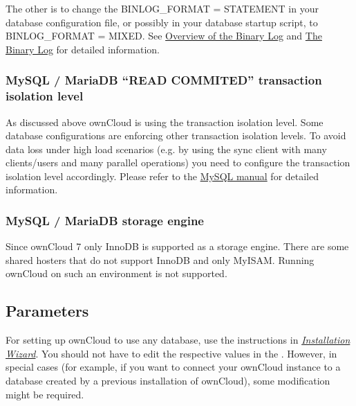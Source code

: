 \documentclass[letterpaper,10pt,english]{sphinxmanual}
\begin{document}
The other is to change the BINLOG\_FORMAT = STATEMENT in your database
configuration file, or possibly in your database startup script, to
BINLOG\_FORMAT = MIXED. See \href{https://mariadb.com/kb/en/mariadb/overview-of-the-binary-log/}{Overview of the Binary
Log} and \href{https://dev.mysql.com/doc/refman/5.6/en/binary-log.html}{The
Binary Log} for
detailed information.


\subsubsection{MySQL / MariaDB ``READ COMMITED'' transaction isolation level}
\label{configuration_database/linux_database_configuration:mysql-mariadb-read-commited-transaction-isolation-level}\label{configuration_database/linux_database_configuration:db-transaction-label}
As discussed above ownCloud is using the  transaction isolation
level. Some database configurations are enforcing other transaction isolation levels. To avoid
data loss under high load scenarios (e.g. by using the sync client with many clients/users and
many parallel operations) you need to configure the transaction isolation level accordingly.
Please refer to the \href{https://dev.mysql.com/doc/refman/5.7/en/set-transaction.html}{MySQL manual}
for detailed information.


\subsubsection{MySQL / MariaDB storage engine}
\label{configuration_database/linux_database_configuration:db-storage-engine-label}\label{configuration_database/linux_database_configuration:mysql-mariadb-storage-engine}
Since ownCloud 7 only InnoDB is supported as a storage engine. There are some shared hosters that
do not support InnoDB and only MyISAM. Running ownCloud on such an environment is not supported.


\subsection{Parameters}
\label{configuration_database/linux_database_configuration:parameters}
For setting up ownCloud to use any database, use the instructions in {\hyperref[installation/installation_wizard::doc]{\emph{\emph{Installation Wizard}}}}. You should not have to edit the respective values in the .  However, in special cases (for example, if you want to connect your ownCloud instance to a database created by a previous installation of ownCloud), some modification might be required.
\end{document}

